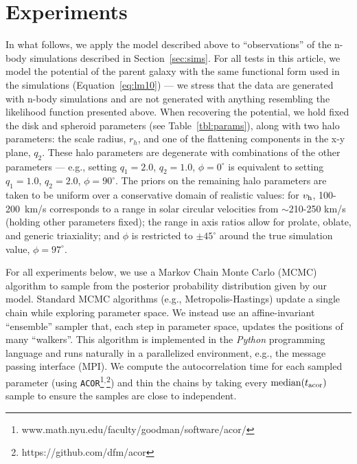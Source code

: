 \documentclass[letterpaper,12pt,preprint]{aastex}
\newcommand{\project}[1]{\textsl{#1}}
\newcommand{\vhalo}{v_{\rm h}}
\begin{document}
\section{Experiments} \label{sec:experiments}
In what follows, we apply the model described above to ``observations'' of the n-body simulations described in Section~\ref{sec:sims}. For all tests in this article, we model the potential of the parent galaxy with the same functional form used in the simulations (Equation~\ref{eq:lm10}) --- we stress that the data are generated with n-body simulations and are not generated with anything resembling the likelihood function presented above. When recovering the potential, we hold fixed the disk and spheroid parameters (see Table~\ref{tbl:params}), along with two halo parameters: the scale radius, $r_h$, and one of the flattening components in the x-y plane, $q_2$. These halo parameters are degenerate with combinations of the other parameters --- e.g., setting $q_1=2.0$, $q_2=1.0$, $\phi=0^\circ$ is equivalent to setting $q_1=1.0$, $q_2=2.0$, $\phi=90^\circ$. The priors on the remaining halo parameters are taken to be uniform over a conservative domain of realistic values: for $\vhalo$, 100-200~km/s corresponds to a range in solar circular velocities from $\sim$210-250 km/s (holding other parameters fixed); the range in axis ratios allow for prolate, oblate, and generic triaxiality; and $\phi$ is restricted to $\pm45^\circ$ around the true simulation value, $\phi = 97^\circ$.

For all experiments below, we use a Markov Chain Monte Carlo (MCMC) algorithm to sample from the posterior probability distribution given by our model. Standard MCMC algorithms (e.g., Metropolis-Hastings) update a single chain while exploring parameter space. We instead use an affine-invariant ``ensemble'' sampler \citep{goodman10} that, each step in parameter space, updates the positions of many ``walkers''. This algorithm is implemented in the \project{Python} programming language \citep{foremanmackey13} and runs naturally in a parallelized environment, e.g., the message passing interface (MPI). We compute the autocorrelation time for each sampled parameter (using \texttt{ACOR}\footnote{www.math.nyu.edu/faculty/goodman/software/acor/}$^{,}$\footnote{https://github.com/dfm/acor}) and thin the chains by taking every $\mathrm{median}(t_{\rm acor})$ sample to ensure the samples are close to independent.

\end{document}
